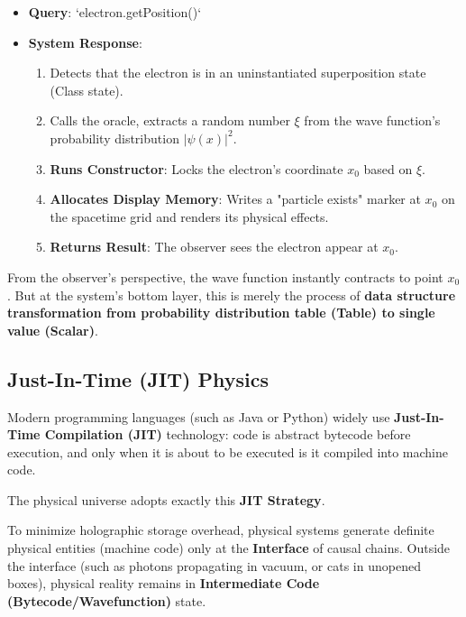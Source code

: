 \begin{itemize}
\item \textbf{Query}: `electron.getPosition()`

\item \textbf{System Response}:

  \begin{enumerate}
  \item Detects that the electron is in an uninstantiated superposition state (Class state).

  \item Calls the oracle, extracts a random number $\xi$ from the wave function's probability distribution $|\psi(x)|^2$.

  \item \textbf{Runs Constructor}: Locks the electron's coordinate $x_0$ based on $\xi$.

  \item \textbf{Allocates Display Memory}: Writes a "particle exists" marker at $x_0$ on the spacetime grid and renders its physical effects.

  \item \textbf{Returns Result}: The observer sees the electron appear at $x_0$.
  \end{enumerate}
\end{itemize}

From the observer's perspective, the wave function instantly contracts to point $x_0$. But at the system's bottom layer, this is merely the process of \textbf{data structure transformation from probability distribution table (Table) to single value (Scalar)}.

\subsection{Just-In-Time (JIT) Physics}

Modern programming languages (such as Java or Python) widely use \textbf{Just-In-Time Compilation (JIT)} technology: code is abstract bytecode before execution, and only when it is about to be executed is it compiled into machine code.

The physical universe adopts exactly this \textbf{JIT Strategy}.

\begin{theorem}
To minimize holographic storage overhead, physical systems generate definite physical entities (machine code) only at the \textbf{Interface} of causal chains. Outside the interface (such as photons propagating in vacuum, or cats in unopened boxes), physical reality remains in \textbf{Intermediate Code (Bytecode/Wavefunction)} state.
\end{theorem}

